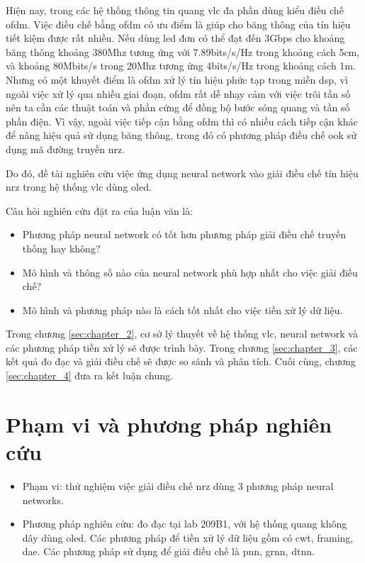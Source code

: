 Hiện nay, trong các hệ thống thông tin quang \ac{vlc} đa phần dùng kiểu điều chế \ac{ofdm}.  Việc điều chế bằng \ac{ofdm} có ưu điểm là giúp cho băng thông của tín hiệu tiết kiệm được rất nhiều. Nếu dùng \ac{led} đơn có thể đạt đến 3Gbps cho khoảng băng thông khoảng 380Mhz tương ứng với 7.89bits/s/Hz trong khoảng cách 5cm, và khoảng 80Mbits/s trong 20Mhz tương ứng 4bits/s/Hz trong khoảng cách 1m. Nhưng có một khuyết điểm là \ac{ofdm} xử lý tín hiệu phức tạp trong miền \ac{dsp}, vì ngoài việc xử lý qua nhiều giai đoạn, \ac{ofdm} rất dễ nhạy cảm với việc trôi tần số nên ta cần các thuật toán và phần cứng để đồng bộ bước sóng quang và tần số phần điện. Vì vậy, ngoài việc tiếp cận bằng \ac{ofdm} thì có nhiều cách tiếp cận khác để nâng hiệu quả sử dụng băng thông, trong đó có phương pháp điều chế \ac{ook} sử dụng mã đường truyền \ac{nrz}.

Do đó, đề tài nghiên cứu việc ứng dụng neural network vào giải điều chế tín hiệu \ac{nrz} trong hệ thống \ac{vlc} dùng \ac{oled}. 

Câu hỏi nghiên cứu đặt ra của luận văn là: 
\begin{itemize}
\item Phương pháp neural network có tốt hơn phương pháp giải điều chế truyền thống hay không?
\item Mô hình và thông số nào của neural network phù hợp nhất cho việc giải điều chế?
\item Mô hình và phương pháp nào là cách tốt nhất cho việc tiền xử lý dữ liệu.
\end{itemize} 

Trong chương \ref{sec:chapter_2}, cơ sở lý thuyết về hệ thống \ac{vlc}, neural network và các phương pháp tiền xử lý sẽ được trình bày. Trong chương \ref{sec:chapter_3}, các kết quả đo đạc và giải điều chế sẽ được so sánh và phân tích. Cuối cùng, chương \ref{sec:chapter_4} đưa ra kết luận chung.

\section{Phạm vi và phương pháp nghiên cứu}
\begin{itemize}
\item Phạm vi: thử nghiệm việc giải điều chế \ac{nrz} dùng 3 phương pháp neural networks.
\item Phương pháp nghiên cứu: đo đạc tại lab 209B1, với hệ thống quang không dây dùng \ac{oled}. Các phương pháp để tiền xử lý dữ liệu gồm có \ac{cwt}, framing, \ac{dae}. Các phương pháp sử dụng để giải điều chế là \ac{pnn}, \ac{grnn}, \ac{dtnn}.
\end{itemize}
